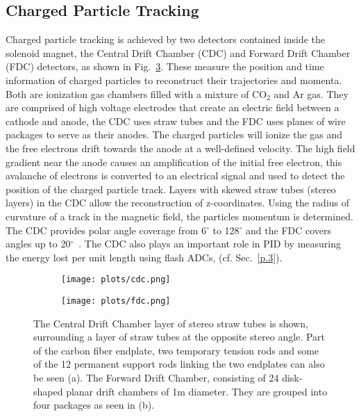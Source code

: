 {\subsection{Charged Particle Tracking}
\label{p.2.2.2}

Charged particle tracking is achieved by two detectors contained inside the solenoid magnet, the Central Drift Chamber (CDC) and Forward Drift Chamber (FDC) detectors, as shown in Fig.~\ref{fig.2.2.2}. These measure the position and time information of charged particles to reconstruct their trajectories and momenta. Both are ionization gas chambers filled with a mixture of CO$_2$ and Ar gas. They are comprised of high voltage electrodes that create an electric field between a cathode and anode, the CDC uses straw tubes and the FDC uses planes of wire packages to serve as their anodes. The charged particles will ionize the gas and the free electrons drift towards the anode at a well-defined velocity. The high field gradient near the anode causes an amplification of the initial free electron, this avalanche of electrons is converted to an electrical signal and used to detect the position of the charged particle track. Layers with skewed straw tubes (stereo layers) in the CDC allow the reconstruction of z-coordinates. Using the radius of curvature of a track in the magnetic field, the particles momentum is determined. The CDC provides polar angle coverage from 6$^{\circ}$ to 128$^{\circ}$ and the FDC covers angles up to 20$^{\circ}$~\cite{GlueX97}. The CDC also plays an important role in PID by measuring the energy lost per unit length using flash ADCs, (cf. Sec.~\ref{p.3}).

\begin{figure}[H]
    \centering
    \begin{subfigure}[b]{0.7\textwidth}
        \texttt{[image: plots/cdc.png]}
        \caption{}
        \label{fig.2.2.2.a}
    \end{subfigure}
    \vfill
    \begin{subfigure}[b]{0.7\textwidth}
        \texttt{[image: plots/fdc.png]}
        \caption{}
        \label{fig.2.2.2.b}
    \end{subfigure}
    \caption{The Central Drift Chamber layer of stereo straw tubes is shown, surrounding a layer of straw tubes at the opposite stereo angle. Part of the carbon fiber endplate, two temporary tension rods and some of the 12 permanent support rods linking the two endplates can also be seen (a). The Forward Drift Chamber, consisting of 24 disk-shaped planar drift chambers of 1m diameter. They are grouped into four packages as seen in (b).}
    \label{fig.2.2.2}
\end{figure}

}
